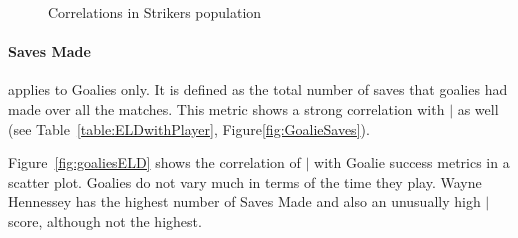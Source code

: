 {\begin{figure}
		\caption{Correlations in Strikers population\label{fig:strikersELD}}
	\end{figure}


	 
	\paragraph{Saves Made} applies to Goalies only. It is defined as the total number of saves that goalies had made over all the matches. This metric shows a strong correlation with $\mid$ as well (see Table~\ref{table:ELDwithPlayer}, Figure\ref{fig:GoalieSaves}).  
	
	Figure~\ref{fig:goaliesELD} shows the correlation of $\mid$ with Goalie success metrics in a scatter plot. Goalies do not vary much in terms of the time they play. Wayne Hennessey has the highest number of Saves Made and also an unusually high $\mid$ score, although not the highest. 


}
